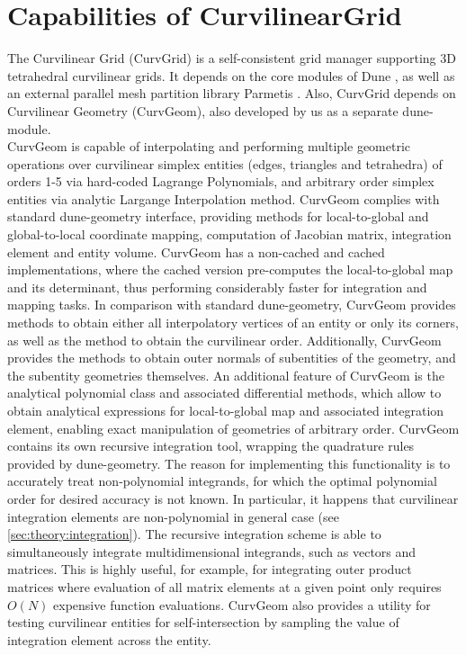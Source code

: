 \section{Capabilities of CurvilinearGrid}
\label{section-outline-capabilities}

The Curvilinear Grid (CurvGrid) is a self-consistent grid manager supporting 3D tetrahedral curvilinear grids. It depends on the core modules of Dune \citeDune{}, as well as an external parallel mesh partition library Parmetis \citeParMetis{}. Also, CurvGrid depends on Curvilinear Geometry (CurvGeom), also developed by us as a separate dune-module. \\

\noindent
CurvGeom is capable of interpolating and performing multiple geometric operations over curvilinear simplex entities (edges, triangles and tetrahedra) of orders 1-5 via hard-coded Lagrange Polynomials, and arbitrary order simplex entities via analytic Largange Interpolation method. CurvGeom complies with standard dune-geometry interface, providing methods for local-to-global and global-to-local coordinate mapping, computation of Jacobian matrix, integration element and entity volume. CurvGeom has a non-cached and cached implementations, where the cached version pre-computes the local-to-global map and its determinant, thus performing considerably faster for integration and mapping tasks. In comparison with standard dune-geometry, CurvGeom provides methods to obtain either all interpolatory vertices of an entity or only its corners, as well as the method to obtain the curvilinear order. Additionally, CurvGeom provides the methods to obtain outer normals of subentities of the geometry, and the subentity geometries themselves. An additional feature of CurvGeom is the analytical polynomial class and associated differential methods, which allow to obtain analytical expressions for local-to-global map and associated integration element, enabling exact manipulation of geometries of arbitrary order. CurvGeom contains its own recursive integration tool, wrapping the quadrature rules provided by dune-geometry. The reason for implementing this functionality is to accurately treat non-polynomial integrands, for which the optimal polynomial order for desired accuracy is not known. In particular, it happens that curvilinear integration elements are non-polynomial in general case (see \cref{sec:theory:integration}). The recursive integration scheme is able to simultaneously integrate multidimensional integrands, such as vectors and matrices. This is highly useful, for example, for integrating outer product matrices where evaluation of all matrix elements at a given point only requires $O(N)$ expensive function evaluations. CurvGeom also provides a utility for testing curvilinear entities for self-intersection by sampling the value of integration element across the entity. \\

